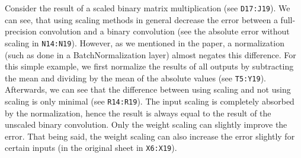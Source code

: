 \documentclass[10pt,twocolumn,letterpaper]{article}
\begin{document}
Consider the result of a scaled binary matrix multiplication (see \texttt{D17:J19}).
We can see, that using scaling methods in general decrease the error between a full-precision convolution and a binary convolution (see the absolute error without scaling in \texttt{N14:N19}).
However, as we mentioned in the paper, a normalization (such as done in a BatchNormalization layer) almost negates this difference.
For this simple example, we first normalize the results of all outputs by subtracting the mean and dividing by the mean of the absolute values (see \texttt{T5:Y19}).
Afterwards, we can see that the difference between using scaling and not using scaling is only minimal (see \texttt{R14:R19}).
The input scaling is completely absorbed by the normalization, hence the result is always equal to the result of the unscaled binary convolution.
Only the weight scaling can slightly improve the error.
That being said, the weight scaling can also increase the error slightly for certain inputs (\eg in the original sheet in \texttt{X6:X19}).

% 
% 
\end{document}
